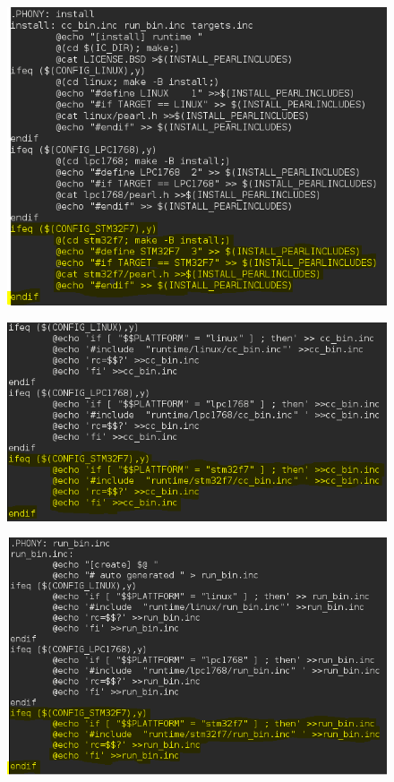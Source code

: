 \begin{figure}[h]
\begin{center}
\includegraphics[width=15cm]{grafiken/Makefile_runtime3.png}
\end{center}
\end{figure}
\clearpage
\begin{figure}[h]
\begin{center}
\includegraphics[width=16cm]{grafiken/Makefile_runtime4.png}
\end{center}
\end{figure}

\begin{figure}[h]
\begin{center}
\includegraphics[width=16cm]{grafiken/Makefile_runtime5.png}
\end{center}
\end{figure}
\clearpage
